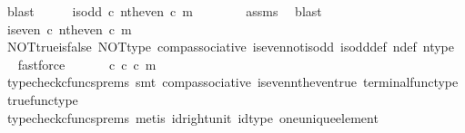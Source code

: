 \begin{isabellebody}
\ blast\isanewline
\ \ \isamarkupfalse%
\ \isamarkupfalse%
\ {\isachardoublequoteopen}is{\isacharunderscore}{\kern0pt}odd\ {\isasymcirc}\isactrlsub c\ nth{\isacharunderscore}{\kern0pt}even\ {\isasymcirc}\isactrlsub c\ m\ {\isacharequal}{\kern0pt}\ {\isasymt}{\isachardoublequoteclose}\isanewline
\ \ \ \ \isamarkupfalse%
\ assms{\isacharparenleft}{\kern0pt}{}{\isacharparenright}{\kern0pt}\ \isamarkupfalse%
\ blast\isanewline
\ \ \isamarkupfalse%
\ \isamarkupfalse%
\ {\isachardoublequoteopen}is{\isacharunderscore}{\kern0pt}even\ {\isasymcirc}\isactrlsub c\ nth{\isacharunderscore}{\kern0pt}even\ {\isasymcirc}\isactrlsub c\ m\ {\isacharequal}{\kern0pt}\ {\isasymf}{\isachardoublequoteclose}\isanewline
\ \ \ \ \isamarkupfalse%
\ NOT{\isacharunderscore}{\kern0pt}true{\isacharunderscore}{\kern0pt}is{\isacharunderscore}{\kern0pt}false\ NOT{\isacharunderscore}{\kern0pt}type\ comp{\isacharunderscore}{\kern0pt}associative{}\ is{\isacharunderscore}{\kern0pt}even{\isacharunderscore}{\kern0pt}not{\isacharunderscore}{\kern0pt}is{\isacharunderscore}{\kern0pt}odd\ is{\isacharunderscore}{\kern0pt}odd{\isacharunderscore}{\kern0pt}def{}\ n{\isacharunderscore}{\kern0pt}def\ n{\isacharunderscore}{\kern0pt}type\ \isamarkupfalse%
\ fastforce\isanewline
\ \ \isamarkupfalse%
\ \isamarkupfalse%
\ {\isachardoublequoteopen}{\isasymt}\ {\isasymcirc}\isactrlsub c\ {\isasymbeta}\isactrlbsub {\isasymnat}\isactrlsub c\isactrlesub \ {\isasymcirc}\isactrlsub c\ m\ {\isacharequal}{\kern0pt}\ {\isasymf}{\isachardoublequoteclose}\isanewline
\ \ \ \ \isamarkupfalse%
\ {\isacharparenleft}{\kern0pt}typecheck{\isacharunderscore}{\kern0pt}cfuncs{\isacharunderscore}{\kern0pt}prems{\isacharcomma}{\kern0pt}\ smt\ comp{\isacharunderscore}{\kern0pt}associative{}\ is{\isacharunderscore}{\kern0pt}even{\isacharunderscore}{\kern0pt}nth{\isacharunderscore}{\kern0pt}even{\isacharunderscore}{\kern0pt}true\ terminal{\isacharunderscore}{\kern0pt}func{\isacharunderscore}{\kern0pt}type\ true{\isacharunderscore}{\kern0pt}func{\isacharunderscore}{\kern0pt}type{\isacharparenright}{\kern0pt}\isanewline
\ \ \isamarkupfalse%
\ \isamarkupfalse%
\ {\isachardoublequoteopen}{\isasymt}\ {\isacharequal}{\kern0pt}\ {\isasymf}{\isachardoublequoteclose}\isanewline
\ \ \ \ \isamarkupfalse%
\ {\isacharparenleft}{\kern0pt}typecheck{\isacharunderscore}{\kern0pt}cfuncs{\isacharunderscore}{\kern0pt}prems{\isacharcomma}{\kern0pt}\ metis\ id{\isacharunderscore}{\kern0pt}right{\isacharunderscore}{\kern0pt}unit{}\ id{\isacharunderscore}{\kern0pt}type\ one{\isacharunderscore}{\kern0pt}unique{\isacharunderscore}{\kern0pt}element{\isacharparenright}{\kern0pt}\isanewline

\end{isabellebody}
